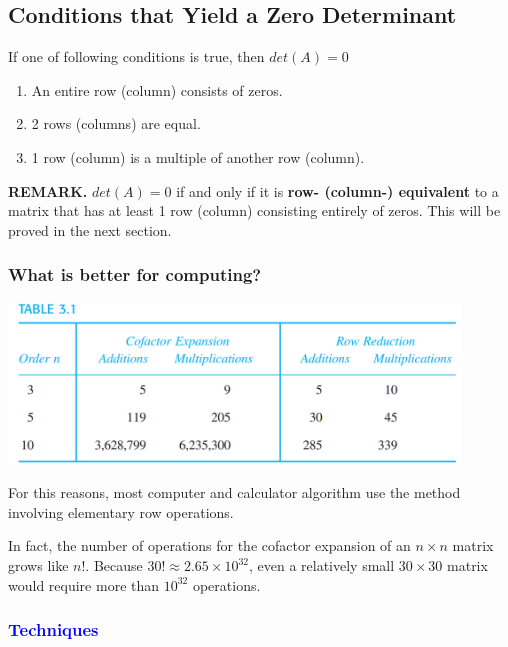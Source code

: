 \documentclass{article}
\newcommand\B{\textbf}
\newcommand\tcl{\begin{tcolorbox}[colback = {blue9}]}
\newcommand\etcl{\end{tcolorbox}}
\newcommand\x{\times}
\begin{document}
        \subsection{Conditions that Yield a \B{Zero Determinant}}
        \tcl
        If one of following conditions is true, then $det(A) = 0$
        \begin{enumerate}
            \item An entire row (column) consists of zeros.
            \item 2 rows (columns) are equal.
            \item 1 row (column) is a multiple of another row (column).
        \end{enumerate}
        \B{REMARK.} $det(A) = 0$ if and only if it is \B{row- (column-) equivalent} to a matrix that has at least 1 row (column)
        consisting entirely of zeros. This will be proved in the next section.
        \etcl
        
        \subsubsection*{What is better for computing?}
        \begin{center}
            \includegraphics[width = 12cm]{images/numoperationfordet.png}
        \end{center}
        For this reasons, most computer and calculator algorithm use the method involving elementary row operations.

        In fact, the number of operations for the cofactor expansion of an $n \x n$ matrix grows like $n!$. Because 
        $30! \approx 2.65 \x 10^{32}$, even a relatively small $30 \x 30$ matrix would require more than $10^{32}$ operations.

        \subsubsection*{\textcolor{blue}{Techniques}}
\end{document}
